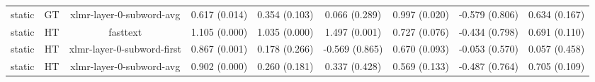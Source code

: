 \begin{sidewaystable}[htb]
\begin{tabular}{@{}ccccccccc@{}}
        static & GT & xlmr-layer-0-subword-avg & 0.617 (0.014) & 0.354 (0.103) & 0.066 (0.289) & 0.997 (0.020) & -0.579 (0.806) & 0.634 (0.167) \\
        static & HT & fasttext & 1.105 (0.000) & 1.035 (0.000) & 1.497 (0.001) & 0.727 (0.076) & -0.434 (0.798) & 0.691 (0.110) \\
        static & HT & xlmr-layer-0-subword-first & 0.867 (0.001) & 0.178 (0.266) & -0.569 (0.865) & 0.670 (0.093) & -0.053 (0.570) & 0.057 (0.458) \\
        static & HT & xlmr-layer-0-subword-avg & 0.902 (0.000) & 0.260 (0.181) & 0.337 (0.428) & 0.569 (0.133) & -0.487 (0.764) & 0.705 (0.109) \\
        \bottomrule
    \end{tabular}
\end{sidewaystable}